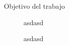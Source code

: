 \documentclass[usenames,dvipsnames,landscape]{beamer}
\begin{document}
\begin{frame}{Objetivo del trabajo}
	\begin{figure}
		\begin{minipage}{0.4\slidewidth}
			asdasd
		\end{minipage}%
		\vspace{1cm}
		\begin{minipage}{0.4\slidewidth}
			asdasd
		\end{minipage}
		\begin{minipage}{0.68\slidewidth}
			
		\end{minipage}
	\end{figure}
\end{frame}
\end{document}
